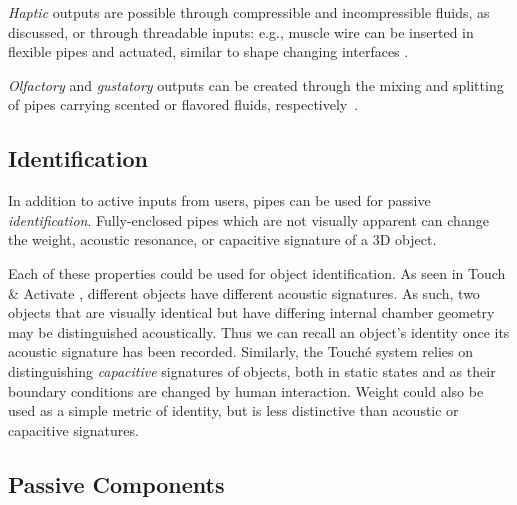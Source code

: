 \emph{Haptic} outputs are possible through compressible and incompressible fluids, as discussed, or through threadable inputs: e.g., muscle wire can be inserted in flexible pipes and actuated, similar to shape changing interfaces \cite{Coelho-shapechanging}.

\emph{Olfactory} and \emph{gustatory} outputs can be created through the mixing and splitting of pipes carrying scented or flavored fluids, respectively~\cite{kaye2004making}.

\subsection{Identification}
In addition to active inputs from users, pipes can be used for passive \emph{identification}.  Fully-enclosed pipes which are not visually apparent can change the weight, acoustic resonance, or capacitive signature of a 3D object. 

Each of these properties could be used for object identification. As seen in Touch \& Activate \cite{Ono-touchandactivate}, different objects have different acoustic signatures.  As such, two objects that are visually identical but have differing internal chamber geometry may be distinguished acoustically.  Thus we can recall an object's identity once its acoustic signature has been recorded.  Similarly, the Touch\'{e} system \cite{Sato-touche} relies on distinguishing \emph{capacitive} signatures of objects, both in static states and as their boundary conditions are changed by human interaction. Weight could also be used as a simple metric of identity, but is less distinctive than acoustic or capacitive signatures.


\subsection{Passive Components}

